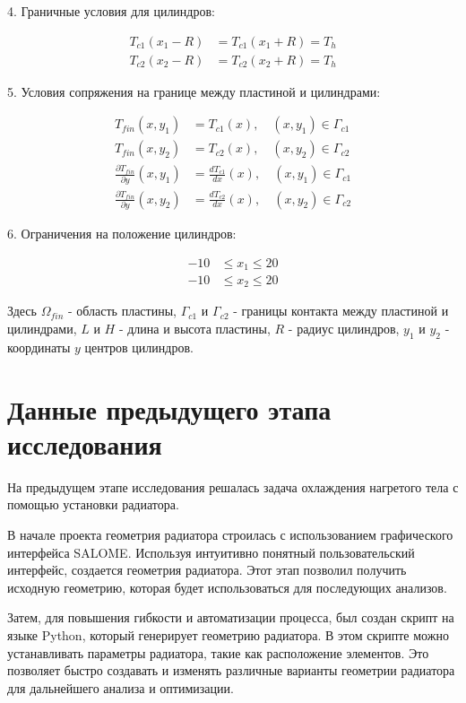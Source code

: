 \documentclass[a4paper,12pt]{article}
\theoremstyle{plain} %
\theoremstyle{definition} %
\theoremstyle{remark} %
\begin{document}
4. Граничные условия для цилиндров:

\begin{align*}
	T_{c1}(x_1 - R) & = T_{c1}(x_1 + R) = T_h \\
	T_{c2}(x_2 - R) & = T_{c2}(x_2 + R) = T_h
\end{align*}

5. Условия сопряжения на границе между пластиной и цилиндрами:

\begin{align*}
	T_{fin}(x, y_1)                             & = T_{c1}(x), \quad (x, y_1) \in \Gamma_{c1}             \\
	T_{fin}(x, y_2)                             & = T_{c2}(x), \quad (x, y_2) \in \Gamma_{c2}             \\
	\frac{\partial T_{fin}}{\partial y}(x, y_1) & = \frac{dT_{c1}}{dx}(x), \quad (x, y_1) \in \Gamma_{c1} \\
	\frac{\partial T_{fin}}{\partial y}(x, y_2) & = \frac{dT_{c2}}{dx}(x), \quad (x, y_2) \in \Gamma_{c2}
\end{align*}

6. Ограничения на положение цилиндров:

\begin{align*}
	-10 & \leq x_1 \leq 20 \\
	-10 & \leq x_2 \leq 20
\end{align*}

Здесь $\Omega_{fin}$ - область пластины, $\Gamma_{c1}$ и $\Gamma_{c2}$ - границы контакта между пластиной и цилиндрами, $L$ и $H$ - длина и высота пластины, $R$ - радиус цилиндров, $y_1$ и $y_2$ - координаты $y$ центров цилиндров.

\section{Данные предыдущего этапа исследования}

На предыдущем этапе исследования решалась задача охлаждения нагретого тела с помощью установки радиатора.

В начале проекта геометрия радиатора строилась с использованием графического интерфейса SALOME. Используя интуитивно понятный пользовательский интерфейс, создается геометрия радиатора. Этот этап позволил получить исходную геометрию, которая будет использоваться для последующих анализов.

Затем, для повышения гибкости и автоматизации процесса, был создан скрипт на языке Python, который генерирует геометрию радиатора. В этом скрипте можно устанавливать параметры радиатора, такие как расположение элементов. Это позволяет быстро создавать и изменять различные варианты геометрии радиатора для дальнейшего анализа и оптимизации.
\end{document}
